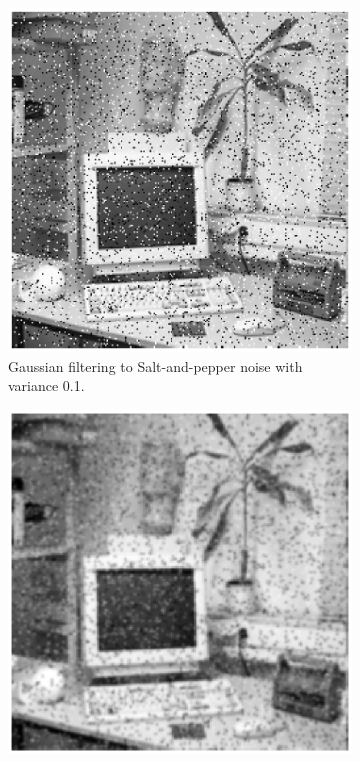 \documentclass[11pt,a4paper]{article}
\begin{document}
\begin{itemize}
\begin{figure}[!ht]
		\begin{subfigure}[t]{.32\linewidth} %
			\includegraphics[width=\columnwidth]{Q17_Gauss_to_Sap_0_1.eps}
			\caption{\scriptsize Gaussian filtering to Salt-and-pepper noise with variance 0.1.}
			\label{fig:gaussToSap0.1}
		\end{subfigure}
		\begin{subfigure}[t]{.32\linewidth} %
			\includegraphics[width=\columnwidth]{Q17_Gauss_to_Sap_1.eps}

\end{subfigure}
\end{figure}
\end{itemize}
\end{document}
